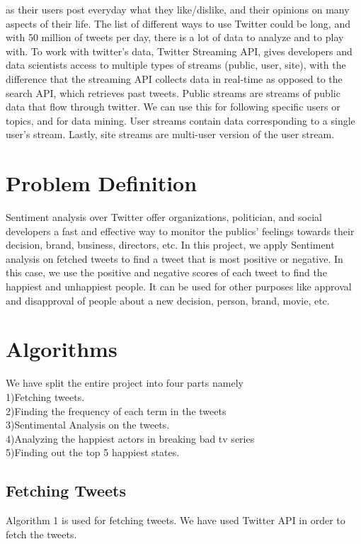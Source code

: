 \documentclass[11pt,english]{article}
\begin{document}
as their users post everyday what they like/dislike, and their opinions on many aspects of their life.
The list of different ways to use Twitter could be long, and with 50 million of tweets per day, there
is a lot of data to analyze and to play with.
To work with twitter’s data, Twitter Streaming API, gives developers and data scientists access to
multiple types of streams (public, user, site), with the difference that the streaming API collects
data in real-time as opposed to the search API, which retrieves past tweets. Public streams are
streams of public data that flow through twitter. We can use this for following specific users or
topics, and for data mining. User streams contain data corresponding to a single user’s stream.
Lastly, site streams are multi-user version of the user stream.

\section{Problem Definition}
Sentiment analysis over Twitter offer organizations, politician, and social developers a fast and
effective way to monitor the publics’ feelings towards their decision, brand, business, directors,
etc. In this project, we apply Sentiment analysis on fetched tweets to find a tweet that is most
positive or negative. In this case, we use the positive and negative scores of each tweet to find the
happiest and unhappiest people. It can be used for other purposes like approval and disapproval of
people about a new decision, person, brand, movie, etc.

\section{Algorithms}
We have split the entire project into four parts namely\\1)Fetching tweets.\\2)Finding the frequency of each term in the tweets\\3)Sentimental Analysis on the tweets.\\4)Analyzing the happiest actors in breaking bad tv series\\ 5)Finding out the top 5 happiest states.

\subsection{Fetching Tweets}
Algorithm 1 is used for fetching tweets. We have used Twitter API in order to fetch the tweets.
\end{document}
